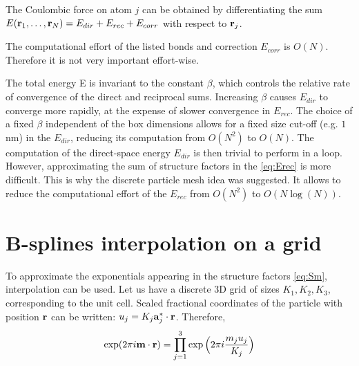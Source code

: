 \documentclass[12pt,a4paper]{report}
\newcommand{\draft}[1]{#1}
\begin{document}
The Coulombic force on atom $j$ can be obtained by differentiating the sum $E(\bold{r}_1, \dotsc, \bold{r}_N) = E_{dir} + E_{rec} + E_{corr}$ with respect to $\bold{r}_j$. 

The computational effort of the listed bonds and correction $E_{corr}$ is $O(N)$. Therefore it is not very important effort-wise.

The total energy E is invariant to the constant $\beta$, which
controls the relative rate of convergence of the direct and
reciprocal sums. Increasing $\beta$ causes $E_{dir}$ to converge more
rapidly, at the expense of slower convergence in $E_{rec}$.
The choice of a fixed $\beta$ independent of the box
dimensions allows for a fixed size cut-off (e.g. $1$ nm) in the
$E_{dir}$, reducing its computation from $O(N^2)$ to $O(N)$.
The computation of the direct-space energy $E_{dir}$ is then trivial to perform in a loop. However, approximating the sum of structure factors in the \eqref{eq:Erec} is more difficult. This is why the discrete particle mesh idea was suggested. It allows to reduce the computational effort of the $E_{rec}$ from $O(N^2)$ to  $O(N \log (N))$.


\section{B-splines interpolation on a grid}
To approximate the exponentials appearing in the structure factors \eqref{eq:Sm}, interpolation can be used. Let us have a discrete 3D grid of sizes $K_1, K_2, K_3$, corresponding to the  unit cell. Scaled fractional coordinates of the particle with position $\bold{r}$ can be written: $u_j = K_j \bold{a}_j^*\cdot  \bold{r}$. 
Therefore, 
\[\exp(2\pi i\bold{m}\cdot\bold{r}) = \prod\limits_{j=1}^3\exp\Big(2\pi i\frac{m_j u_j}{K_j}\Big)\]

\end{document}
